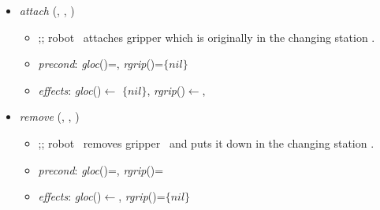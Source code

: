 \begin{itemize}
\begin{comment}
\item \textit{moveAboveBox} (\robot, \constant{box}, {\constant{pos1}}, {\constant{pos2}})
\begin{itemize}kit trays
\item ;; robot \robot\ moves above the box \constant{box}, i.e., from position \constant{pos1} to position \constant{pos2}. Here, \constant{box} designates a box of empty kit trays or a box of finished kit trays.
\item \textit{precond}: \textit{rpos}(\robot)={\constant{pos1}}
\item \textit{effects}: \textit{rpos}(\robot)$\leftarrow${\constant{pos2}}, \textit{rabove}(\robot)$\leftarrow$\constant{box}
\end{itemize}
\begin{comment}
\item \textit{moveAboveBFK} (\boxfkt, {\constant{pos1}}, {\constant{pos2}})
\begin{itemize}
\item ;;\robot\ moves above the box of full kit trays \boxfkt\ at the position {\constant{pos2}}. The previous position of the robot is {\constant{pos1}}, the final position is {\constant{pos2}}.
\item \textit{precond}: \textit{rpos}(\robot)={\constant{pos1}}
\item \textit{effects}: \textit{rpos}(\robot)$\leftarrow${\constant{pos2}}
\end{itemize}
\end{comment}

\item \textit{attach} (\robot, \grip, \chstation)
\begin{itemize}
\item ;; robot \robot\ attaches gripper \grip which is originally in the changing station \chstation.
\item \textit{precond}: \textit{gloc}(\grip)=\chstation, \textit{rgrip}(\robot)=$\lbrace nil\rbrace$
\item \textit{effects}: \textit{gloc}(\grip)$\leftarrow$ $\lbrace nil\rbrace$, \textit{rgrip}(\robot)$\leftarrow$\grip,
\end{itemize}

\item \textit{remove} (\robot, \grip, \chstation)
\begin{itemize}
\item ;; robot \robot\ removes gripper \grip\ and puts it down in the changing station \chstation.
\item \textit{precond}: \textit{gloc}(\grip)=\robot, \textit{rgrip}(\robot)=\grip
\item \textit{effects}: \textit{gloc}(\grip)$\leftarrow$\chstation, \textit{rgrip}(\robot)=$\lbrace nil\rbrace$
\end{itemize}
\end{itemize} 

